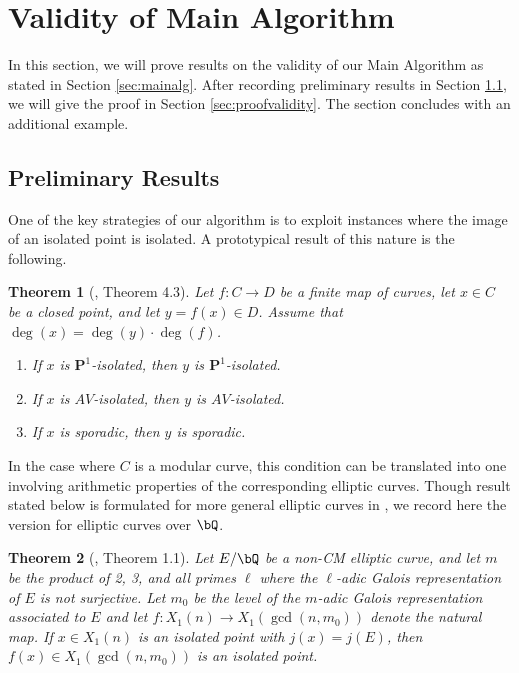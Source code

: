 \documentclass[11pt,reqno]{amsart}
\theoremstyle{plain}
\newtheorem{theorem}{Theorem}%
\theoremstyle{definition}
\newcommand{\Q}{\bQ}
\newcommand{\PP}{\mathbf P}
\begin{document}
\section{Validity of Main Algorithm}
\label{sec:validity}

In this section, we will prove results on the validity of our Main Algorithm as stated in Section \ref{sec:mainalg}. After recording preliminary results in Section \ref{sec:prelimresult}, we will give the proof in Section \ref{sec:proofvalidity}. The section concludes with an additional example.

\subsection{Preliminary Results}
\label{sec:prelimresult}
One of the key strategies of our algorithm is to exploit instances where the image of an isolated point is isolated. A prototypical result of this nature is the following.
\begin{theorem}[\cite{BELOV}, Theorem 4.3]
\label{thm:PushingForwardSporadicIsolated}
    Let $f\colon C \to D$ be a finite map of curves, let $x\in C$ be a closed point, and let $y = f(x) \in D$.  Assume that $\deg(x) = \deg(y)\cdot\deg(f)$.
    \begin{enumerate}
        \item If $x$ is $\PP^1$-isolated, then $y$ is $\PP^1$-isolated.
                \item If $x$ is $AV$-isolated, then $y$ is $AV$-isolated.
        \item If $x$ is sporadic, then $y$ is sporadic.
    \end{enumerate}
\end{theorem}

In the case where $C$ is a modular curve, this condition can be translated into one involving arithmetic properties of the corresponding elliptic curves. Though result stated below is formulated for more general elliptic curves in \cite{BELOV}, we record here the version for elliptic curves over $\Q$.

\begin{theorem}[\cite{BELOV}, Theorem 1.1]\label{BELOVthm}
Let $E/\Q$ be a non-CM elliptic curve, and let $m$ be the product of 2, 3, and all primes $\ell$ where the $\ell$-adic Galois representation of $E$ is not surjective. Let $m_0$ be the level of the $m$-adic Galois representation associated to $E$ and let $f\colon X_1(n) \rightarrow X_1(\gcd(n,m_0))$ denote the natural map. If $x\in X_1(n)$ is an isolated point with $j(x)=j(E)$, then $f(x)\in X_1(\gcd(n,m_0))$ is an isolated point.
\end{theorem}
\end{document}
